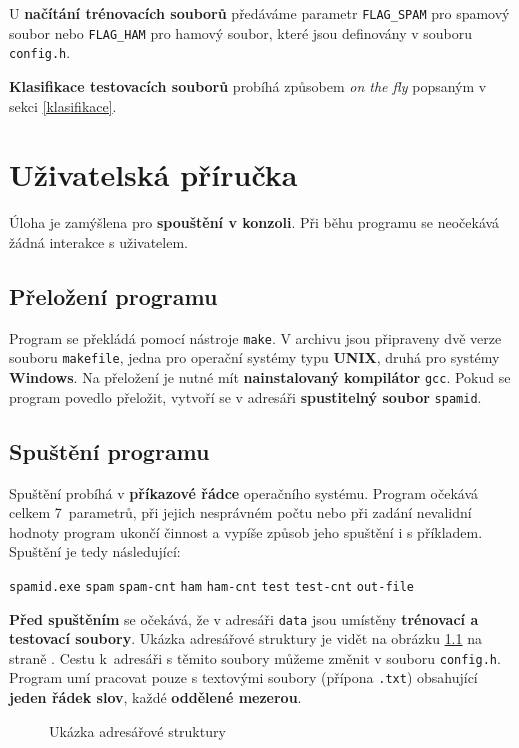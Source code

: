 \documentclass[12pt]{report}
\newcommand\la{\textlangle}  					%
\newcommand\ra{\textrangle}						%
\newcommand\laratexttt[1]{\la\texttt{#1}\ra}	%
\newcommand\indentt[1]{						
	\setlength\parindent{5mm}
	#1
	\setlength\parindent{0mm}
	}											%
\begin{document}
 	U \textbf{načítání trénovacích souborů} předáváme parametr \texttt{FLAG\_SPAM} pro spamový soubor nebo \texttt{FLAG\_HAM} pro hamový soubor, které jsou definovány v souboru \texttt{config.h}.
 	
 	\textbf{Klasifikace testovacích souborů} probíhá způsobem \textit{on the fly} popsaným v sekci \ref{klasifikace}.
 	 	
	\chapter{Uživatelská příručka}
	Úloha je zamýšlena pro \textbf{spouštění v konzoli}. Při běhu programu se neočekává žádná interakce s uživatelem.
	
	\section{Přeložení programu}
	Program se překládá pomocí nástroje \texttt{make}. V archivu jsou připraveny dvě verze souboru \texttt{makefile}, jedna pro operační systémy typu \textbf{UNIX}, druhá pro systémy \textbf{Windows}. Na přeložení je nutné mít \textbf{nainstalovaný kompilátor} \texttt{gcc}. Pokud se program povedlo přeložit, vytvoří se v adresáři \textbf{spustitelný soubor} \texttt{spamid}.
		
	\section{Spuštění programu}
	Spuštění probíhá v \textbf{příkazové řádce} operačního systému. Program očekává celkem 7~parametrů, při jejich nesprávném počtu nebo při zadání nevalidní hodnoty program ukončí činnost a vypíše způsob jeho spuštění i s příkladem. Spuštění je tedy následující:
	
	\indentt{\texttt{spamid.exe} \laratexttt{spam} \laratexttt{spam-cnt} \laratexttt{ham} \laratexttt{ham-cnt} \laratexttt{test} \laratexttt{test-cnt} \laratexttt{out-file}$\,$\keys{\return}}
	
	\textbf{Před spuštěním} se očekává, že v adresáři \texttt{data} jsou umístěny \textbf{trénovací a testovací soubory}. Ukázka adresářové struktury je vidět na obrázku \ref{fig:struktura} na straně \pageref{fig:struktura}. Cestu k~adresáři s těmito soubory můžeme změnit v souboru \texttt{config.h}. Program umí pracovat pouze s textovými soubory (přípona \texttt{.txt}) obsahující \textbf{jeden řádek slov}, každé \textbf{oddělené mezerou}.
	
	\begin{figure}
		\centering
		\begin{minipage}{40mm}
		\end{minipage}
		\caption{Ukázka adresářové struktury}
		\label{fig:struktura}
	\end{figure}
	
\end{document}

